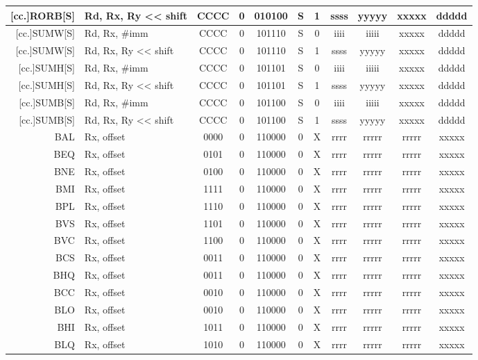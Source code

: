 \documentclass{article}
\begin{document}
\begin{longtable}{|r|l|c|c|c|c|c|ccc|c|}
    {[}cc.]RORB[S] & Rd, Rx, Ry << shift & CCCC & 0 & 010100 & S & 1 & ssss & yyyyy & xxxxx & ddddd \\
    \hline
    {[}cc.]SUMW[S] & Rd, Rx, \#imm & CCCC & 0 & 101110 & S & 0 & iiii & iiiii & xxxxx & ddddd \\
    {[}cc.]SUMW[S] & Rd, Rx, Ry << shift & CCCC & 0 & 101110 & S & 1 & ssss & yyyyy & xxxxx & ddddd \\
    \hline
    {[}cc.]SUMH[S] & Rd, Rx, \#imm & CCCC & 0 & 101101 & S & 0 & iiii & iiiii & xxxxx & ddddd \\
    {[}cc.]SUMH[S] & Rd, Rx, Ry << shift & CCCC & 0 & 101101 & S & 1 & ssss & yyyyy & xxxxx & ddddd \\
    \hline
    {[}cc.]SUMB[S] & Rd, Rx, \#imm & CCCC & 0 & 101100 & S & 0 & iiii & iiiii & xxxxx & ddddd \\
    {[}cc.]SUMB[S] & Rd, Rx, Ry << shift & CCCC & 0 & 101100 & S & 1 & ssss & yyyyy & xxxxx & ddddd \\
    \hline
    BAL & Rx, offset & 0000 & 0 & 110000 & 0 & X & rrrr & rrrrr & rrrrr & xxxxx \\
    BEQ & Rx, offset & 0101 & 0 & 110000 & 0 & X & rrrr & rrrrr & rrrrr & xxxxx \\
    BNE & Rx, offset & 0100 & 0 & 110000 & 0 & X & rrrr & rrrrr & rrrrr & xxxxx \\
    BMI & Rx, offset & 1111 & 0 & 110000 & 0 & X & rrrr & rrrrr & rrrrr & xxxxx \\
    BPL & Rx, offset & 1110 & 0 & 110000 & 0 & X & rrrr & rrrrr & rrrrr & xxxxx \\
    BVS & Rx, offset & 1101 & 0 & 110000 & 0 & X & rrrr & rrrrr & rrrrr & xxxxx \\
    BVC & Rx, offset & 1100 & 0 & 110000 & 0 & X & rrrr & rrrrr & rrrrr & xxxxx \\
    BCS & Rx, offset & 0011 & 0 & 110000 & 0 & X & rrrr & rrrrr & rrrrr & xxxxx \\
    BHQ & Rx, offset & 0011 & 0 & 110000 & 0 & X & rrrr & rrrrr & rrrrr & xxxxx \\
    BCC & Rx, offset & 0010 & 0 & 110000 & 0 & X & rrrr & rrrrr & rrrrr & xxxxx \\
    BLO & Rx, offset & 0010 & 0 & 110000 & 0 & X & rrrr & rrrrr & rrrrr & xxxxx \\
    BHI & Rx, offset & 1011 & 0 & 110000 & 0 & X & rrrr & rrrrr & rrrrr & xxxxx \\
    BLQ & Rx, offset & 1010 & 0 & 110000 & 0 & X & rrrr & rrrrr & rrrrr & xxxxx \\

\end{longtable}
\end{document}
